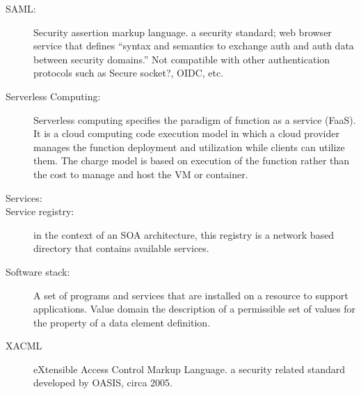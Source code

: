 \begin{description}
\item[SAML:] Security assertion markup language. a security standard;
  web browser service that defines “syntax and semantics to exchange
  auth and auth data between security domains.” Not compatible with
  other authentication protocols such as Secure socket?, OIDC, etc.

\item[Serverless Computing:] Serverless computing specifies the
  paradigm of function as a service (FaaS). It is a cloud computing
  code execution model in which a cloud provider manages the function
  deployment and utilization while clients can utilize them. The
  charge model is based on execution of the function rather than the
  cost to manage and host the VM or container.

\item[Services:] 

\item[Service registry:] in the context of an SOA architecture, this
  registry is a network based directory that contains available
  services.

\item[Software stack:] A set of programs and services that are
  installed on a resource to support applications.  Value domain the
  description of a permissible set of values for the property of a
  data element definition.

\item[XACML] eXtensible Access Control Markup Language. a security
  related standard developed by OASIS, circa 2005.

\end{description}


